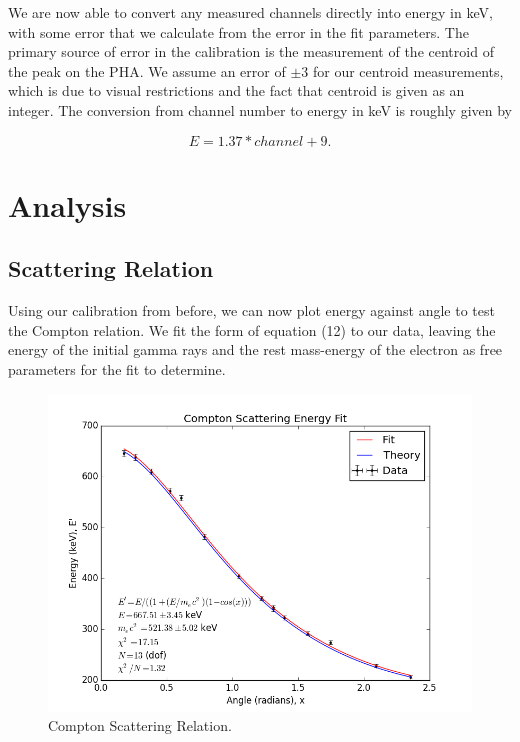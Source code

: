 \documentclass{article}
\begin{document}
\hspace{.25cm}

We are now able to convert any measured channels directly into energy in keV, with some error that we calculate from the error in the fit parameters. The primary source of error in the calibration is the measurement of the centroid of the peak on the PHA. We assume an error of $\pm 3$ for our centroid measurements, which is due to visual restrictions and the fact that centroid is given as an integer. The conversion from channel number to energy in keV is roughly given by

\begin{equation}
	E = 1.37 * channel + 9 .
\end{equation}


\section{Analysis}
\subsection{Scattering Relation}

Using our calibration from before, we can now plot energy against angle to test the Compton relation. We fit the form of equation (12) to our data, leaving the energy of the initial gamma rays and the rest mass-energy of the electron as free parameters for the fit to determine.

\begin{figure}[!htb]
	\centering
	\includegraphics[scale=1]{plots/compton_fit.png}
  	\caption{Compton Scattering Relation.} 
 	\label{compton}
\end{figure}
\end{document}

